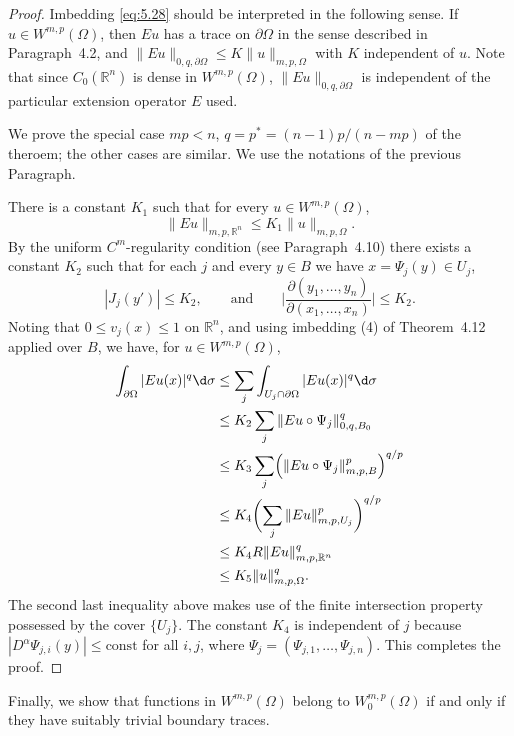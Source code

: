 \begin{proof}
  Imbedding \eqref{eq:5.28} should be interpreted in the following sense.
  If $u\in W^{m,p}(\Omega)$, then $Eu$ has a trace on $\partial\Omega$
  in the sense described in Paragraph~4.2, and $\|Eu\|_{0,q,\partial\Omega}
  \leq K \|u\|_{m,p,\Omega}$ with $K$ independent of $u$. Note that
  since $C_0(\mathbb{R}^n)$ is dense in $W^{m,p}(\Omega)$,
  $\|Eu\|_{0,q,\partial\Omega}$ is independent of the particular extension
  operator $E$ used.

  We prove the special case $mp<n$, $q=p^* = (n-1)p/(n-mp)$ of the theroem;
  the other cases are similar. We use the notations of the previous Paragraph.

  There is a constant $K_1$ such that for every $u\in W^{m,p}(\Omega)$,
  \[ \|Eu\|_{m,p,\mathbb{R}^n} \leq K_1 \|u\|_{m,p,\Omega}. \]
  By the uniform $C^m$-regularity condition (see Paragraph~4.10)
  there exists a constant $K_2$ such that for each $j$ and every $y\in B$
  we have $x = \Psi_j(y) \in U_j$,
  \[ |J_j(y')| \leq K_2, \qquad \text{and} \qquad
      \biggl|\frac{\partial(y_1,\ldots,y_n)}{\partial(x_1,\ldots,x_n)}\biggr| \leq K_2. \]
  Noting that $0\leq v_j(x) \leq 1$ on $\mathbb{R}^n$, and using
  imbedding (4) of Theorem~4.12 applied over $B$, we have, for $u\in W^{m,p}(\Omega)$,
  \begin{align*}
    \int_{\partial\Omega} |Eu(x)|^q \d\sigma
    & \leq \sum_j \int_{U_j \cap \partial\Omega} |Eu(x)|^q \d\sigma \\
    & \leq K_2 \sum_j \|Eu\circ \Psi_j\|_{0,q,B_0}^q \\
    & \leq K_3 \sum_j \Bigl(\|Eu\circ \Psi_j\|_{m,p,B}^p\Bigr)^{q/p} \\
    & \leq K_4 \biggl(\sum_j \|Eu\|_{m,p,U_j}^p\biggr)^{q/p} \\
    & \leq K_4 R \|Eu\|_{m,p,\mathbb{R}^n}^q \\
    & \leq K_5 \|u\|_{m,p,\Omega}^q.
  \end{align*}
  The second last inequality above makes use of the finite intersection
  property possessed by the cover $\{U_j\}$. The constant $K_4$
  is independent of $j$ because $|D^\alpha \Psi_{j,i}(y)|\leq \text{const}$
  for all $i,j$, where $\Psi_j = (\Psi_{j,1},\ldots, \Psi_{j,n})$.
  This completes the proof.
\end{proof}

Finally, we show that functions in $W^{m,p}(\Omega)$ belong to
$W_0^{m,p}(\Omega)$ if and only if they have suitably trivial boundary traces.



